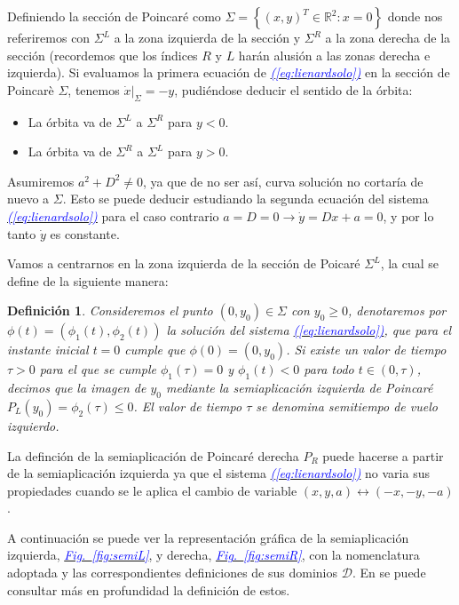 \documentclass[12pt,a4paper]{report} %
\newtheorem{definicion}{Definición}[chapter] %
\newcommand{\fref}[1]{\hyperref[#1]{\textcolor{blue}{\textit{Fig.~\ref*{#1}}}}}
\newcommand{\eref}[1]{\hyperref[#1]{\textcolor{blue}{\textit{(\ref*{#1})}}}}
\begin{document}
	Definiendo la sección de Poincaré como $\varSigma=\left\{(x,y)^T\in \mathbb{R}^2:x=0\right\}$ donde nos referiremos con $\varSigma^L$ a la zona izquierda de la sección y $\varSigma^R$ a la zona derecha de la sección (recordemos que los índices $R$ y $L$ harán alusión a las zonas derecha e izquierda). Si evaluamos la primera ecuación de \eref{eq:lienardsolo} en la sección de Poincarè $\varSigma$, tenemos $\dot{x}|_{\varSigma}=-y$, pudiéndose deducir el sentido de la órbita:
	
	\begin{itemize}
		\item La órbita va de $\varSigma^L$ a $\varSigma^R$ para $y<0$.
		\item La órbita va de $\varSigma^R$ a $\varSigma^L$ para $y>0$.
	\end{itemize}
	
	Asumiremos $a^2+D^2\neq0$, ya que de no ser así, curva solución no cortaría de nuevo a $\varSigma$. Esto se puede deducir estudiando la segunda ecuación del sistema \eref{eq:lienardsolo} para el caso contrario $a=D=0 \longrightarrow \dot{y}=Dx+a=0$, y por lo tanto $\dot{y}$ es constante.
	
	\vspace{0.5cm}Vamos a centrarnos en la zona izquierda de la sección de Poicaré $\varSigma^L$, la cual se define de la siguiente manera:

	\vspace{0.5cm}
	\begin{definicion}
		\label{def6}
		Consideremos el punto $(0,y_0)\in \varSigma$ con $y_0\geq0$, denotaremos por $\phi(t)=(\phi_1(t),\phi_2(t))$ la solución del sistema \eref{eq:lienardsolo}, que para el instante inicial $t=0$ cumple que $\phi(0)=(0,y_0)$. Si existe un valor de tiempo $\tau>0$ para el que se cumple $\phi_1(\tau)=0$ y $\phi_1(t)<0$ para todo $t\in(0,\tau)$, decimos que la imagen de $y_0$ mediante la semiaplicación izquierda de Poincaré $P_L(y_0)=\phi_2(\tau)\leq0$. El valor de tiempo $\tau$ se denomina semitiempo de vuelo izquierdo.
	\end{definicion}
	
	\vspace{0.5cm}La definción de la semiaplicación de Poincaré derecha $P_R$ puede hacerse a partir de la semiaplicación izquierda ya que el sistema \eref{eq:lienardsolo} no varia sus propiedades cuando se le aplica el cambio de variable $(x,y,a)\longleftrightarrow(-x,-y,-a)$.
	
	\newpage
	
	\vspace{0.5cm} A continuación se puede ver la representación gráfica de la semiaplicación izquierda, \fref{fig:semiL}, y derecha, \fref{fig:semiR}, con la nomenclatura adoptada y las correspondientes definiciones de sus dominios $\mathcal{D}$. En \cite{caracterizacion} se puede consultar más en profundidad la definición de estos.
\end{document}
